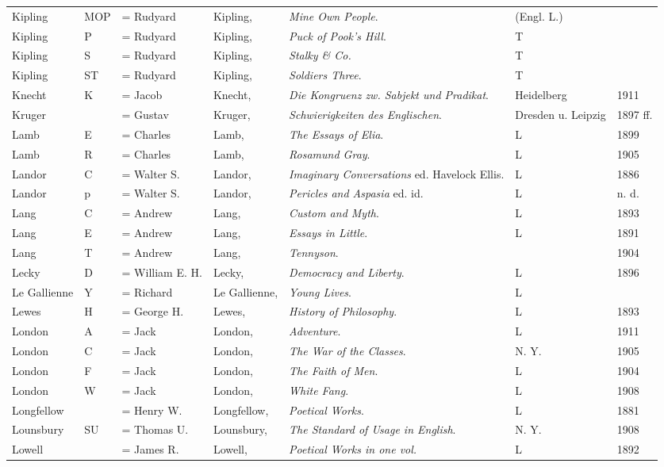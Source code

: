 \begin{sidewaystable}
\centering\small
\begin{tabular}{p{} p{} p{} p{} p{} p{} p{}}
Kipling& MOP & = Rudyard & Kipling, & \textit{Mine Own People}. & (Engl. L.) & \\
Kipling& P & = Rudyard & Kipling, & \textit{Puck of Pook's Hill}. & T & \\
Kipling& S & = Rudyard & Kipling, & \textit{Stalky \& Co.} & T & \\
Kipling& ST & = Rudyard & Kipling, & \textit{Soldiers Three}. & T & \\
Knecht & K & = Jacob & Knecht, & \textit{Die Kongruenz zw. Sabjekt und Pradikat}. & Heidelberg & 1911 \\
Kruger & & = Gustav & Kruger, & \textit{Schwierigkeiten des Englischen}. & Dresden u. Leipzig & 1897 ff. \\
Lamb & E & = Charles & Lamb, & \textit{The Essays of Elia}. & L & 1899 \\
Lamb& R & = Charles & Lamb, & \textit{Rosamund Gray}. & L & 1905 \\
Landor & C & = Walter S. & Landor, & \textit{Imaginary Conversations} ed. Havelock Ellis. & L & 1886 \\
Landor& p & = Walter S. & Landor, & \textit{Pericles and Aspasia} ed. id. & L & n. d. \\
Lang & C & = Andrew & Lang, & \textit{Custom and Myth}. & L & 1893 \\
Lang& E & = Andrew & Lang, & \textit{Essays in Little}. & L & 1891 \\
Lang& T & = Andrew & Lang, & \textit{Tennyson}. & & 1904 \\
Lecky & D & = William E. H. & Lecky, & \textit{Democracy and Liberty}. & L & 1896 \\
Le Gallienne & Y & = Richard & Le Gallienne, & \textit{Young Lives}. & L & \\
Lewes & H & = George H. & Lewes, & \textit{History of Philosophy}. & L & 1893 \\
London & A & = Jack & London, & \textit{Adventure}. & L & 1911 \\
London& C & = Jack & London, & \textit{The War of the Classes}. & N. Y. & 1905 \\
London& F & = Jack & London, & \textit{The Faith of Men}. & L & 1904 \\
London& W & = Jack & London, & \textit{White Fang}. & L & 1908 \\
Longfellow & & = Henry W. & Longfellow, & \textit{Poetical Works}. & L & 1881 \\
Lounsbury & SU & = Thomas U. & Lounsbury, & \textit{The Standard of Usage in English}. & N. Y. & 1908 \\
Lowell & & = James R. & Lowell, & \textit{Poetical Works in one vol.} & L & 1892 \\
\end{tabular}
\end{sidewaystable}



